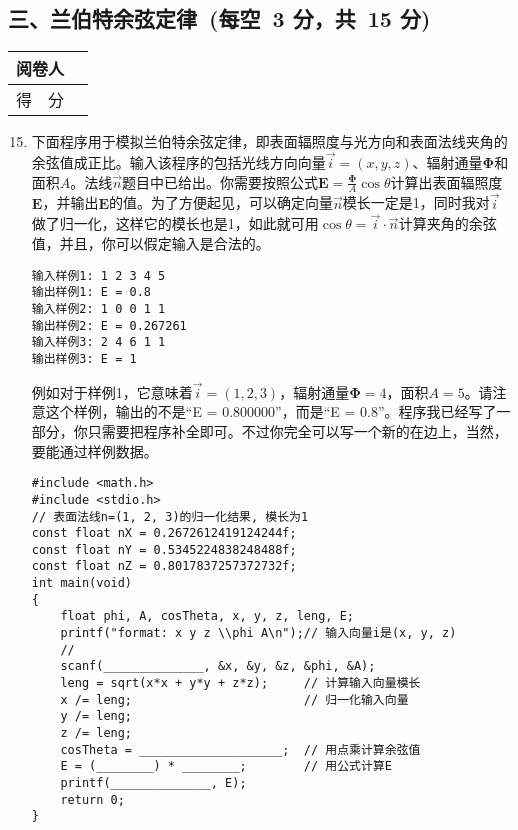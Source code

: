 \documentclass[twocolumn,landscape,UTF8]{ctexart}
\begin{document}
\begin{spacing}{1.3}
\section*{\hspace{4.5cm} 三、兰伯特余弦定律~(每空~3 分，共~15 分)}
\vspace{-1.5cm}
\begin{tabular}{|p{}|p{}|}
  \hline
    \centering 阅卷人 &         \\
  \hline
    \centering 得~~分 &         \\
  \hline
\end{tabular}
\begin{enumerate}\setcounter{enumi}{14}
    \item 下面程序用于模拟兰伯特余弦定律，即表面辐照度与光方向和表面法线夹角的余弦值成正比。输入该程序的包括光线方向向量$\vec{i}=\left(x,y,z\right)$、辐射通量$\boldsymbol{\Phi}$和面积$A$。法线$\vec n$题目中已给出。你需要按照公式$\boldsymbol{E}=\frac{\boldsymbol{\Phi}}{A}\cos{\theta}$计算出表面辐照度$\boldsymbol{E}$，并输出$\boldsymbol{E}$的值。为了方便起见，可以确定向量$\vec n$模长一定是1，同时我对$\vec i$做了归一化，这样它的模长也是1，如此就可用$\cos{\theta}=\vec{i}\cdot\vec{n}$计算夹角的余弦值，并且，你可以假定输入是合法的。
\begin{lstlisting}
输入样例1: 1 2 3 4 5
输出样例1: E = 0.8
输入样例2: 1 0 0 1 1
输出样例2: E = 0.267261
输入样例3: 2 4 6 1 1
输出样例3: E = 1
\end{lstlisting}
    例如对于样例1，它意味着$\vec{i}=\left(1,2,3\right)$，辐射通量$\boldsymbol{\Phi}=4$，面积$A=5$。请注意这个样例，输出的不是``E = 0.800000''，而是``E = 0.8''。程序我已经写了一部分，你只需要把程序补全即可。不过你完全可以写一个新的在边上，当然，要能通过样例数据。
\begin{lstlisting}
#include <math.h>
#include <stdio.h>
// 表面法线n=(1, 2, 3)的归一化结果, 模长为1
const float nX = 0.2672612419124244f;
const float nY = 0.5345224838248488f;
const float nZ = 0.8017837257372732f;
int main(void)
{
    float phi, A, cosTheta, x, y, z, leng, E;
    printf("format: x y z \\phi A\n");// 输入向量i是(x, y, z)
    //
    scanf(______________, &x, &y, &z, &phi, &A);
    leng = sqrt(x*x + y*y + z*z);     // 计算输入向量模长
    x /= leng;                        // 归一化输入向量
    y /= leng;
    z /= leng;
    cosTheta = ____________________;  // 用点乘计算余弦值
    E = (________) * ________;        // 用公式计算E
    printf(______________, E);
    return 0;
}
\end{lstlisting}
\end{enumerate}

\end{spacing}
\end{document}
